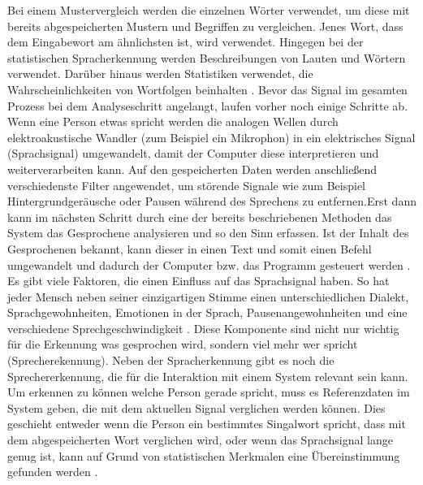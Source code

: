Bei einem Mustervergleich werden die einzelnen Wörter verwendet, um diese mit bereits abgespeicherten Mustern und Begriffen zu vergleichen. Jenes Wort, dass dem Eingabewort am ähnlichsten ist, wird verwendet.
Hingegen bei der statistischen Spracherkennung werden Beschreibungen von Lauten und Wörtern verwendet. Darüber hinaus werden Statistiken verwendet, die Wahrscheinlichkeiten von Wortfolgen beinhalten \cite{KaufmannPfisterSprache}. 
\newline
\newline
Bevor das Signal im gesamten Prozess bei dem Analyseschritt angelangt, laufen vorher noch einige Schritte ab. Wenn eine Person etwas spricht werden die analogen Wellen durch elektroakustische Wandler (zum Beispiel ein Mikrophon) in ein elektrisches Signal (Sprachsignal) umgewandelt, damit der Computer diese interpretieren und weiterverarbeiten kann. Auf den gespeicherten Daten werden anschließend verschiedenste Filter angewendet, um störende Signale wie zum Beispiel Hintergrundgeräusche oder Pausen während des Sprechens zu entfernen.Erst dann kann im nächsten Schritt durch eine der bereits beschriebenen Methoden das System das Gesprochene analysieren und so den Sinn erfassen. Ist der Inhalt des Gesprochenen bekannt, kann dieser in einen Text und somit einen Befehl umgewandelt und dadurch der Computer bzw. das Programm gesteuert werden \cite{KaufmannPfisterSprache}.
\newline \newline
Es gibt viele Faktoren, die einen Einfluss auf das Sprachsignal haben. So hat jeder Mensch neben seiner einzigartigen Stimme einen unterschiedlichen Dialekt, Sprachgewohnheiten, Emotionen in der Sprach, Pausenangewohnheiten und eine verschiedene Sprechgeschwindigkeit \cite{KaufmannPfisterSprache}. Diese Komponente sind nicht nur wichtig für die Erkennung was gesprochen wird, sondern viel mehr wer spricht (Sprecherekennung).
\newline \newline
Neben der Spracherkennung gibt es noch die Sprechererkennung, die für die Interaktion mit einem System relevant sein kann. Um erkennen zu können welche Person gerade spricht, muss es Referenzdaten im System geben, die mit dem aktuellen Signal verglichen werden können. Dies geschieht entweder wenn die Person ein bestimmtes Singalwort spricht, dass mit dem abgespeicherten Wort verglichen wird, oder wenn das Sprachsignal lange genug ist, kann auf Grund von statistischen Merkmalen eine Übereinstimmung gefunden werden \cite{KaufmannPfisterSprache}. 
